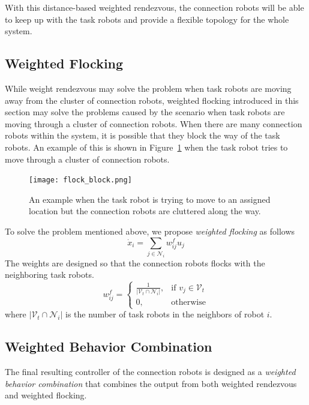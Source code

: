 \documentclass[../main.tex]{subfiles}
\begin{document}
With this distance-based weighted rendezvous, the connection robots will be able to keep up with the task robots and provide a flexible topology for the whole system.

\subsection{Weighted Flocking}
While weight rendezvous may solve the problem when task robots are moving away from the cluster of connection robots, weighted flocking introduced in this section may solve the problems caused by the scenario when task robots are moving through a cluster of connection robots. When there are many connection robots within the system, it is possible that they block the way of the task robots. An example of this is shown in Figure~\ref{fig:flock_block} when the task robot tries to move through a cluster of connection robots.
\begin{figure}
    \centering
    \texttt{[image: flock\_block.png]}
    \caption{An example when the task robot is trying to move to an assigned location but the connection robots are cluttered along the way.}
    \label{fig:flock_block}
\end{figure}

To solve the problem mentioned above, we propose \textit{weighted flocking} as follows
\begin{equation} 
\dot x_i = \sum_{j \in \mathcal{N}_i} w_{ij}^f u_j
\end{equation}
The weights are designed so that the connection robots flocks with the neighboring task robots. 
\begin{equation} 
w_{ij}^f = 
\begin{cases}
\frac{1}{|\mathcal{V}_t \cap \mathcal{N}_i|}, & \text{if $v_j \in \mathcal{V}_t$}\\
0, &\text{otherwise}
\end{cases}
\end{equation}
where $|\mathcal{V}_t \cap \mathcal{N}_i|$ is the number of task robots in the neighbors of robot $i$.

\subsection{Weighted Behavior Combination}
The final resulting controller of the connection robots is designed as a \textit{weighted behavior combination} that combines the output from both weighted rendezvous and weighted flocking.
\end{document}
